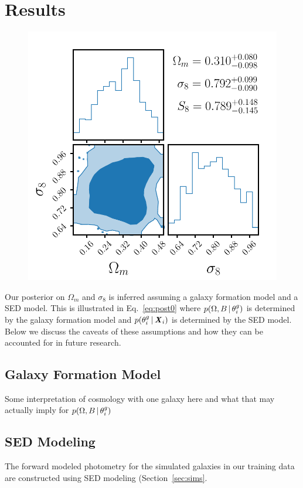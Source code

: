 \section{Results} \label{sec:results}

\begin{figure}[ht]
\vskip 0.2in
\begin{center}
    \centerline{\includegraphics[width=0.9\columnwidth]{figs/p_oms8_x.pdf}}
    \caption{    }\label{fig:p_omega_x}
\end{center}
\vskip -0.2in
\end{figure}

Our posterior on $\Omega_m$ and $\sigma_8$ is inferred assuming a galaxy
formation model and a SED model. 
This is illustrated in Eq.~\ref{eq:post0} where $p(\Omega, B\,|\,\theta^g_i)$
is determined by the galaxy formation model and
$p(\theta^g_i\,|\, {\textbf{\textit{X}}}_i)$ is determined by the SED model.  
Below we discuss the caveats of these assumptions and how they can be accounted
for in future research.

\subsection{Galaxy Formation Model} \label{sec:galmodel}
Some interpretation of cosmology with one galaxy here and what that may
actually imply for $p(\Omega, B\,|\,\theta^g_i)$


\subsection{SED Modeling} \label{sec:sed}
The forward modeled photometry for the simulated galaxies in our training data
are constructed using SED modeling (Section~\ref{sec:sims}. 

